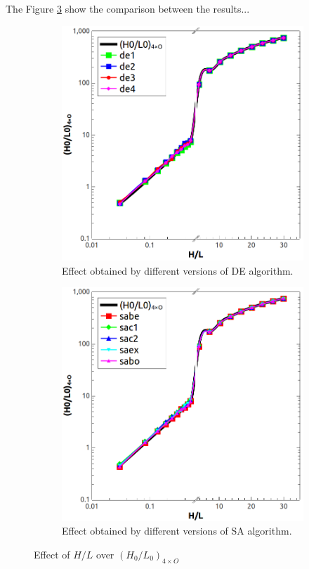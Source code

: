 \documentclass[10pt,fleqn,a4paper,twoside]{article}
\begin{document}
The Figure \ref{figure05} show the comparison between the results...

\begin{figure}[h!]
\centering
	\begin{subfigure}{0.52\textwidth}
		\centering
		\includegraphics[width=1\linewidth]{imgs/5dof/de/g_hl_h0l0_1.png}
		\caption{ {\small Effect obtained by different versions of DE algorithm.}}
		\label{figure05:sub1}
	\end{subfigure}%
	\begin{subfigure}{0.52\textwidth}
		\centering
		\includegraphics[width=1\linewidth]{imgs/5dof/sa/g_hl_h0l0_1.png}
		\caption{ {\small Effect obtained by different versions of SA algorithm.}}
		\label{figure05:sub2}
	\end{subfigure}%
\caption{Effect of $H/L$ over ${(H_{0}/L_{0})_{4\times O}}$}
\label{figure05}
\end{figure}
\end{document}
